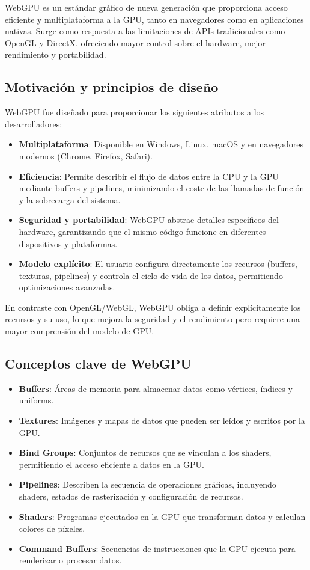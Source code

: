 WebGPU es un estándar gráfico de nueva generación que proporciona acceso
eficiente y multiplataforma a la GPU, tanto en navegadores como en aplicaciones
nativas. Surge como respuesta a las limitaciones de APIs tradicionales
como OpenGL y DirectX, ofreciendo mayor control sobre el hardware, mejor
rendimiento y portabilidad.

\subsection{Motivación y principios de diseño}

WebGPU fue diseñado para proporcionar los siguientes atributos a los desarrolladores:

\begin{itemize}
    \item \textbf{Multiplataforma}: Disponible en Windows, Linux, macOS y en navegadores modernos (Chrome, Firefox, Safari).
    \item \textbf{Eficiencia}: Permite describir el flujo de datos entre la CPU y la GPU mediante buffers y pipelines, minimizando el coste de las llamadas de función y la sobrecarga del sistema.
    \item \textbf{Seguridad y portabilidad}: WebGPU abstrae detalles específicos del hardware, garantizando que el mismo código funcione en diferentes dispositivos y plataformas.
    \item \textbf{Modelo explícito}: El usuario configura directamente los recursos (buffers, texturas, pipelines) y controla el ciclo de vida de los datos, permitiendo optimizaciones avanzadas.
\end{itemize}

En contraste con OpenGL/WebGL, WebGPU obliga a definir explícitamente los
recursos y su uso, lo que mejora la seguridad y el rendimiento pero requiere
una mayor comprensión del modelo de GPU.

\subsection{Conceptos clave de WebGPU}

\begin{itemize}
    \item \textbf{Buffers}: Áreas de memoria para almacenar datos como vértices, índices y uniforms.
    \item \textbf{Textures}: Imágenes y mapas de datos que pueden ser leídos y escritos por la GPU.
    \item \textbf{Bind Groups}: Conjuntos de recursos que se vinculan a los shaders, permitiendo el acceso eficiente a datos en la GPU.
    \item \textbf{Pipelines}: Describen la secuencia de operaciones gráficas, incluyendo shaders, estados de rasterización y configuración de recursos.
    \item \textbf{Shaders}: Programas ejecutados en la GPU que transforman datos y calculan colores de píxeles.
    \item \textbf{Command Buffers}: Secuencias de instrucciones que la GPU ejecuta para renderizar o procesar datos.
\end{itemize}

